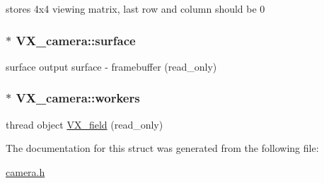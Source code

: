 stores 4x4 viewing matrix, last row and column should be 0 \hypertarget{structVX__camera_add16fec4e751e381a855f9ab311a7873}{
\subsubsection[{surface}]{$\ast$ V\-X\-\_\-camera\-::surface}}\label{structVX__camera_add16fec4e751e381a855f9ab311a7873}
surface output surface -\/ framebuffer (read\-\_\-only) \hypertarget{structVX__camera_a6162d4618d183193b6da7a3d7bfa573b}{
\subsubsection[{workers}]{$\ast$ V\-X\-\_\-camera\-::workers}}\label{structVX__camera_a6162d4618d183193b6da7a3d7bfa573b}
thread object \hyperlink{structVX__field}{V\-X\-\_\-field} (read\-\_\-only) 

The documentation for this struct was generated from the following file\-:\begin{DoxyCompactItemize}
\item 
\hyperlink{camera_8h}{camera.\-h}\end{DoxyCompactItemize}
